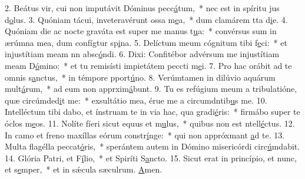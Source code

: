 2. Beátus vir, cui non imputávit Dóminus pecc\uline{á}tum,~* nec est in spíritu jus d\uline{o}lus.
3. Quóniam tácui, inveteravérunt ossa m\uline{e}a,~* dum clamárem tta d\uline{i}e.
4. Quóniam die ac nocte graváta est super me manus t\uline{u}a:~* convérsus sum in ærúmna mea, dum confígtur sp\uline{i}na.
5. Delíctum meum cógnitum tibi f\uline{e}ci:~* et injustítiam meam nn absc\uline{ó}ndi.
6. Dixi: Confitébor advérsum me injustítiam meam D\uline{ó}mino:~* et tu remisísti impietátem peccti m\uline{e}i.
7. Pro hac orábit ad te omnis s\uline{a}nctus,~* in témpore pport\uline{ú}no.
8. Verúmtamen in dilúvio aquárum mult\uline{á}rum,~* ad eum non apprxim\uline{á}bunt.
9. Tu es refúgium meum a tribulatióne, quæ circúmded\uline{i}t me:~* exsultátio mea, érue me a circumdntib\uline{u}s me.
10. Intelléctum tibi dabo, et ínstruam te in via hac, qua gradi\uline{é}ris:~* firmábo super te óclos m\uline{e}os.
11. Nolíte fíeri sicut equus et m\uline{u}lus,~* quibus non est ntell\uline{é}ctus.
12. In camo et freno maxíllas eórum constr\uline{í}nge:~* qui non appróxmant \uline{a}d te.
13. Multa flagélla peccat\uline{ó}ris,~* sperántem autem in Dómino misericórdi circ\uline{ú}mdabit.
14. Glória Patri, et F\uline{í}lio,~* et Spiríti S\uline{a}ncto.
15. Sicut erat in princípio, et nunc, et s\uline{e}mper,~* et in sǽcula sæculrum. \uline{A}men.
